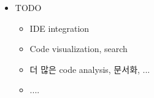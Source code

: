 \begin{frame}[allowframebreaks]
\begin{itemize}
\pagebreak

\item TODO
    \begin{itemize}
    \item IDE integration 
    \item Code  visualization, search
    \item 더 많은 code analysis, 문서화, ...
    \item .... 
    \end{itemize}
\end{itemize}


\end{frame}
